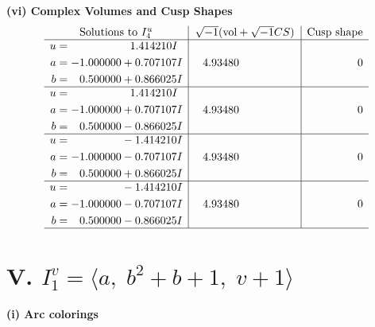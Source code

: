 \documentclass[1p]{elsarticle_modified}
\theoremstyle{definition}
\newcommand{\I}{\sqrt{-1}}
\begin{document}
\newpage\flushleft \textbf{(vi) Complex Volumes and Cusp Shapes}
$$\begin{array}{c|c|c}  
\text{Solutions to }I^u_{4}& \I (\text{vol} + \sqrt{-1}CS) & \text{Cusp shape}\\
 \hline 
\begin{aligned}
u &= \phantom{-0.000000 -}1.414210 I \\
a &= -1.000000 + 0.707107 I \\
b &= \phantom{-}0.500000 + 0.866025 I\end{aligned}
 & \phantom{-}4.93480\phantom{ +0.000000I} & \phantom{-0.000000 } 0 \\ \hline\begin{aligned}
u &= \phantom{-0.000000 -}1.414210 I \\
a &= -1.000000 + 0.707107 I \\
b &= \phantom{-}0.500000 - 0.866025 I\end{aligned}
 & \phantom{-}4.93480\phantom{ +0.000000I} & \phantom{-0.000000 } 0 \\ \hline\begin{aligned}
u &= \phantom{-0.000000 } -1.414210 I \\
a &= -1.000000 - 0.707107 I \\
b &= \phantom{-}0.500000 + 0.866025 I\end{aligned}
 & \phantom{-}4.93480\phantom{ +0.000000I} & \phantom{-0.000000 } 0 \\ \hline\begin{aligned}
u &= \phantom{-0.000000 } -1.414210 I \\
a &= -1.000000 - 0.707107 I \\
b &= \phantom{-}0.500000 - 0.866025 I\end{aligned}
 & \phantom{-}4.93480\phantom{ +0.000000I} & \phantom{-0.000000 } 0\\
 \hline 
 \end{array}$$\newpage\newpage\renewcommand{\arraystretch}{1}
\centering \section*{V. $I^v_{1}= \langle a,\;b^2+b+1,\;v+1 \rangle$}
\flushleft \textbf{(i) Arc colorings}\\
\end{document}
